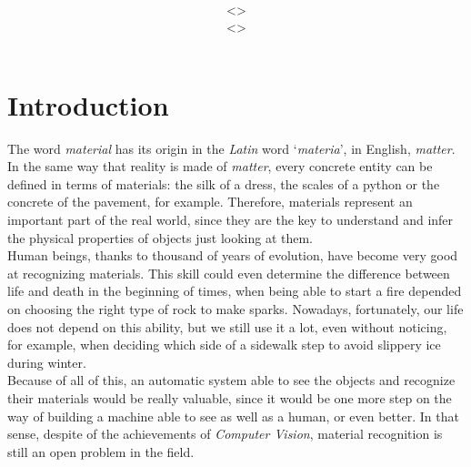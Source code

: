 \documentclass[12pt,a4paper]{article}
\title{\vspace{2in}\textmd{\hmwkClass\\\textbf{\hmwkTitle}}\\\normalsize\vspace{0.1in}\small{\hmwkDueDate}\\\vspace{4in}}
\date{}
\author{
\textbf{\hmwkAuthorNameA} <\texttt{\href{mailto:ruizcep2@illinois.edu}{\hmwkAuthorEmailA}}> \\
\textbf{\hmwkAuthorNameB} <\texttt{\href{mailto:ruizcep2@illinois.edu}{\hmwkAuthorEmailB}}>}
\begin{document}
\begin{singlespace}

\begin{titlepage}
\maketitle
\thispagestyle{empty}
\end{titlepage}

\hypertarget{toc}{}
\tableofcontents
\newpage



\clearpage

\newcommand{\e}[1]{\emph{#1}\xspace}

\section{Introduction}

The word \emph{material} has its origin in the \emph{Latin} word `\emph{materia}', in English, \emph{matter}. In the same way that reality is made of \emph{matter}, every concrete entity can be defined in terms of materials: the silk of a dress, the scales of a python or the concrete of the pavement, for example. Therefore, materials represent an important part of the real world, since they are the key to understand and infer the physical properties of objects just looking at them. \\

Human beings, thanks to thousand of years of evolution, have become very good at recognizing materials. This skill could even determine the difference between life and death in the beginning of times, when being able to start a fire depended on choosing the right type of rock to make sparks. Nowadays, fortunately, our life does not depend on this ability, but we still use it a lot, even without noticing, for example, when deciding which side of a sidewalk step to avoid slippery ice during winter. \\

Because of all of this, an automatic system able to see the objects and recognize their materials would be really valuable, since it would be one more step on the way of building a machine able to see as well as a human, or even better. In that sense, despite of the achievements of \emph{Computer Vision}, material recognition is still an open problem in the field. \\


\end{singlespace}
\end{document}
